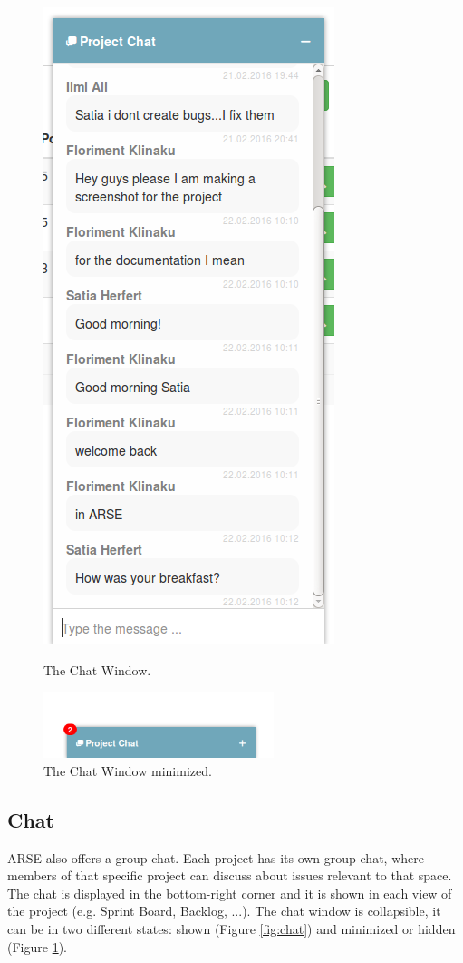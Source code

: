 \documentclass[
	accentcolor=tud1a %
]{tudreport}
\begin{document}
\begin{figure}[ht]
\begin{minipage}{.5\textwidth}
	\includegraphics[height=28EM]{img/chat}
	\caption{The Chat Window.}
	\label{fig:chat}
\end{minipage}
\begin{minipage}{.5\textwidth}
	\centering
	\includegraphics[width=0.6\textwidth]{img/chatNotification}
	\caption{The Chat Window minimized.}
	\label{fig:chat-notification}
\end{minipage}
\end{figure}

\subsection{Chat}
\label{sec:chat}
ARSE also offers a group chat. Each project has its own group chat, where members of that specific project can discuss about issues relevant to that space. The chat is displayed in the bottom-right corner and it is shown in each view of the project (e.g. Sprint Board, Backlog, ...). The chat window is collapsible, it can be in two different states: shown (Figure \ref{fig:chat}) and minimized or hidden (Figure \ref{fig:chat-notification}). 
\end{document}
